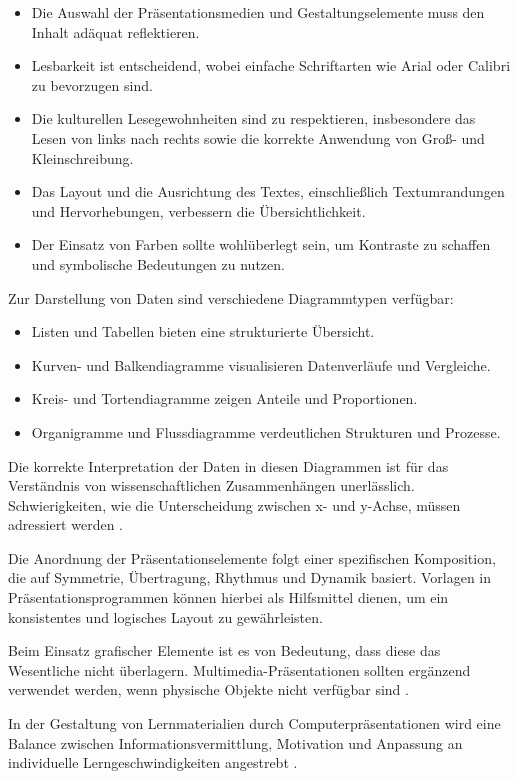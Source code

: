 \begin{itemize}
	\item Die Auswahl der Präsentationsmedien und Gestaltungselemente muss den Inhalt adäquat reflektieren.
	\item Lesbarkeit ist entscheidend, wobei einfache Schriftarten wie Arial oder Calibri zu bevorzugen sind.
	\item Die kulturellen Lesegewohnheiten sind zu respektieren, insbesondere das Lesen von links nach rechts sowie die korrekte Anwendung von Groß- und Kleinschreibung.
	\item Das Layout und die Ausrichtung des Textes, einschließlich Textumrandungen und Hervorhebungen, verbessern die Übersichtlichkeit.
	\item Der Einsatz von Farben sollte wohlüberlegt sein, um Kontraste zu schaffen und symbolische Bedeutungen zu nutzen.
\end{itemize}

Zur Darstellung von Daten sind verschiedene Diagrammtypen verfügbar:

\begin{itemize}
	\item Listen und Tabellen bieten eine strukturierte Übersicht.
	\item Kurven- und Balkendiagramme visualisieren Datenverläufe und Vergleiche.
	\item Kreis- und Tortendiagramme zeigen Anteile und Proportionen.
	\item Organigramme und Flussdiagramme verdeutlichen Strukturen und Prozesse.
\end{itemize}

Die korrekte Interpretation der Daten in diesen Diagrammen ist für das Verständnis von wissenschaftlichen Zusammenhängen unerlässlich. Schwierigkeiten, wie die Unterscheidung zwischen x- und y-Achse, müssen adressiert werden \cite{Happonen2011}.

Die Anordnung der Präsentationselemente folgt einer spezifischen Komposition, die auf Symmetrie, Übertragung, Rhythmus und Dynamik basiert. Vorlagen in Präsentationsprogrammen können hierbei als Hilfsmittel dienen, um ein konsistentes und logisches Layout zu gewährleisten.

Beim Einsatz grafischer Elemente ist es von Bedeutung, dass diese das Wesentliche nicht überlagern. Multimedia-Präsentationen sollten ergänzend verwendet werden, wenn physische Objekte nicht verfügbar sind \cite{Urbanova2008}.

In der Gestaltung von Lernmaterialien durch Computerpräsentationen wird eine Balance zwischen Informationsvermittlung, Motivation und Anpassung an individuelle Lerngeschwindigkeiten angestrebt \cite{Vermirovsky2010}.

